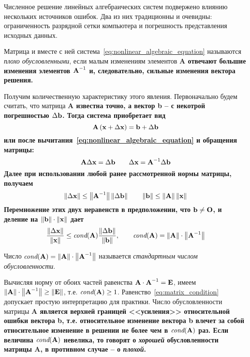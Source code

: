 Численное решение линейных алгебраических систем подвержено влиянию нескольких источников ошибок.
Два из них традиционны и очевидны: ограниченность разрядной сетки компьютера и погрешность представления
исходных данных.
\begin{definition}
    Матрица и вместе с ней система~\eqref{eq:nonlinear_algebraic_equation} называются
    \emph{плохо обусловленными}, если малым изменениям элементов \bf{A} отвечают большие
    изменения элементов $\bf{A}^{-1}$ и, следовательно, сильные изменения вектора решения.
\end{definition}
Получим количественную характеристику этого явления. Первоначально будем считать, что
матрица \bf{A} известна точно, а вектор \bf{b} -- с некотрой погрешностью $\Delta \bf{b}$.
Тогда система приобретает вид
\begin{equation*}
    \bf{A}\left( \bf{x} + \Delta \bf{x} \right) = \bf{b} + \Delta \bf{b}
\end{equation*}
или после вычитания~\eqref{eq:nonlinear_algebraic_equation} и обращения матрицы:
\begin{equation*}
    \bf{A}\Delta\bf{x} = \Delta \bf{b} \qquad \Delta \bf{x} = \bf{A}^{-1}\Delta \bf{b}
\end{equation*}
Далее при использовании любой ранее рассмотренной нормы матрицы, получаем
\begin{equation*}
    \left\| \Delta \bf{x} \right\| \leq \left\| \bf{A}^{-1} \right\| \left\| \Delta \bf{b} \right\| \qquad \left\| \bf{b} \right\| \leq \left\| \bf{A} \right\| \left\| \bf{x} \right\|
\end{equation*}
Перемножение этих двух неравенств в предположении, что $\bf{b} \neq \bf{O}$, и деление на $\left\| \bf{b} \right\| \cdot \left\| \bf{x} \right\|$ дает
\begin{equation}
    \frac{\left\| \Delta \bf{x} \right\|}{\left\| \bf{x} \right\|} \leq \textit{cond}(\bf{A})\frac{\left\| \Delta \bf{b} \right\|}{\left\| \bf{b} \right\|},
    \qquad \textit{cond}(\bf{A}) = \left\| \bf{A} \right\| \cdot \left\| \bf{A}^{-1} \right\| \label{eq:matrix_condition}
\end{equation}
\begin{definition}
    Число $\displaystyle \textit{cond}(\bf{A}) = \left\| \bf{A} \right\| \cdot \left\| \bf{A}^{-1} \right\|$ называется
    \emph{стандартным числом обусловленности}.
\end{definition}
Вычисляя норму от обоих частей равенства $\displaystyle \bf{A} \cdot \bf{A}^{-1} = \bf{E}$, имеем
$\displaystyle \left\| \bf{A} \right\| \cdot \left\| \bf{A}^{-1} \right\| \geq \left\| \bf{E} \right\|$,
т.е. $\textit{cond}(\bf{A}) \geq 1$. Равенство~\eqref{eq:matrix_condition} допускает простую интерпретацию
для практики. Число обусловленности матрицы \bf{A} является верхней границей <<усиления>> относительной
ошибки вектора \bf{b}, т.е. относительное изменение вектора \bf{b} влечет за собой относительное изменение
в решении не более чем в $\textit{cond}(\bf{A})$ раз. Если величина $\textit{cond}(\bf{A})$ невелика, то
говорят о \emph{хорошей} обусловленности матрицы \bf{A}, в противном случае -- о \emph{плохой}.
\vspace{5pt}

